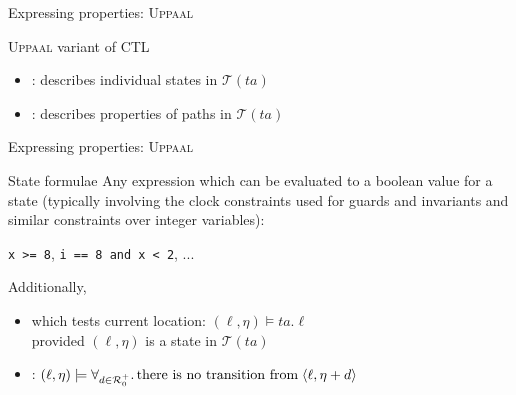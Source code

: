 \documentclass[aspectratio=169]{beamer}
\def\R{\mathcal{R}}
\def\TL#1{\mathcal{T}(#1)}
\begin{document}
\begin{slide}{Expressing properties: \textsc{Uppaal}}
\small

\begin{block}{\textsc{Uppaal} variant of \textsc{CTL}}
\begin{itemize}
\item {}:  describes individual states in $\TL{ta}$
\item {}: describes properties of paths in $\TL{ta}$
\end{itemize}
\end{block}

\end{slide}

\begin{slide}{Expressing properties: \textsc{Uppaal}}
\small

\begin{block}{State formulae}
Any expression which can be evaluated to a boolean value for a state (typically involving the 
\alert{clock constraints} used for guards and invariants and similar constraints over integer variables):
\begin{center}
\texttt{x >= 8}, \texttt{i == 8 and x < 2}, ...
\end{center}
Additionally,
\begin{itemize}
\item {} which tests \alert{current location}:  $(\ell, \eta) \models ta.\ell$ \\
provided $(\ell, \eta)$ is a state in $\TL{ta}$
\item {}: $(\ell, \eta) \models \forall_{d \in \R_0^+} .\, \text{there is no transition from} \; \pair{\ell,\eta+d}$ 
\end{itemize}
\end{block}

\end{slide}
\end{document}
